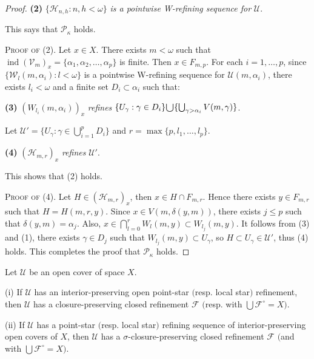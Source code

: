 \documentclass[main.tex]{subfiles}
\begin{document}
\begin{proof}
\textbf{(2)}  $\{\mathscr{H}_{n,h}: n,h < \omega\}$ \textit{is a pointwise W-refining sequence for} $\mathscr{U}$.

This says that $\mathcal{P}_\kappa$ holds.

\noindent\textsc{Proof of (2)}. Let $x \in X$. There exists $m<\omega$ such that 
$\operatorname{ind}(\mathscr{V}_m)_x = \{\alpha_1, \alpha_2, \dots, \alpha_p\}$ is finite. Then $x \in F_{m,p}$. For each $i = 1, \dots, p$, since 
$\{\mathscr{W}_l(m, \alpha_i): l < \omega\}$ is a pointwise W-refining sequence for 
$\mathscr{U}(m, \alpha_i)$, 
there exists $l_i < \omega$ and a finite set $D_i \subset \alpha_i$ such that:

\textbf{(3)}  $(W_{l_i}(m, \alpha_i))_x$ \textit{refines} $\{U_\gamma: \gamma \in D_i\} 
 \raisebox{-2pt}{\scalebox{1.5}{$\cup$}}
\{\bigcup_{\gamma > \alpha_i}V(m, \gamma)\}$.

\noindent Let $\mathscr{U}' = \{U_\gamma: \gamma \in \bigcup_{i=1}^{p} D_i\}$ and 
$r = \max\{p,  l_1, \dots, l_p\}$.

\textbf{(4)}  $(\mathscr{H}_{m,r})_x$ \textit{ refines } $\mathscr{U}'$.

This shows that (2) holds.

\noindent\textsc{Proof of (4).} Let $H \in (\mathscr{H}_{m,r})_x$, then $x\in H\cap F_{m,r}$.
Hence there exists $y \in F_{m,r}$ such that $H= H(m, r, y)$.
Since $x\in V(m, \delta(y, m))$, there exists $j \le p$ such that $\delta(y, m) = \alpha_j$.
Also, $x\in\bigcap_{l=0}^r W_l(m, y)\subset W_{l_j}(m, y)$. It follows from (3) and (1), there exists
$\gamma \in D_j$ such that $W_{l_j}(m, y) \subset U_\gamma$, so
$H \subset U_{\gamma} \in \mathscr{U}'$, thus (4) holds. This completes the proof that 
$\mathcal{P}_\kappa$ holds.
\end{proof}

{\lemma{} \label{lem:4.1.6}
Let $\mathscr{U}$ be an open cover of space $X$.

\textup{(i)} If $\mathscr{U}$ has an interior-preserving open point-star $($resp. local star$)$ refinement, 
then $\mathscr{U}$ has a closure-preserving closed refinement 
$\mathscr{F}$ $($resp. with $\bigcup \mathscr{F}^\circ = X)$.

\textup{(ii)} If $\mathscr{U}$ has a point-star $($resp. local star$)$ refining sequence of interior-preserving 
open covers of $X$, then $\mathscr{U}$ has a $\sigma$-closure-preserving closed 
refinement $\mathscr{F}$ $($and with $\bigcup \mathscr{F}^\circ = X)$.
}
\end{document}
